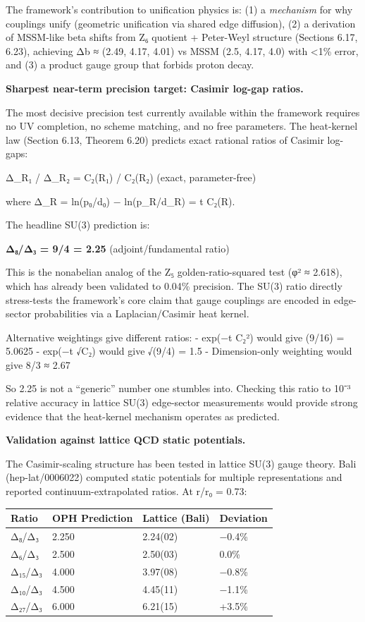 \documentclass[
]{article}
\newcounter{none} %
\begin{document}
The framework's contribution to unification physics is: (1) a
\emph{mechanism} for why couplings unify (geometric unification via
shared edge diffusion), (2) a derivation of MSSM-like beta shifts from
Z₆ quotient + Peter-Weyl structure (Sections 6.17, 6.23), achieving Δb ≈
(2.49, 4.17, 4.01) vs MSSM (2.5, 4.17, 4.0) with \textless1\% error, and
(3) a product gauge group that forbids proton decay.

\textbf{Sharpest near-term precision target: Casimir log-gap ratios.}

The most decisive precision test currently available within the
framework requires no UV completion, no scheme matching, and no free
parameters. The heat-kernel law (Section 6.13, Theorem 6.20) predicts
exact rational ratios of Casimir log-gaps:

Δ\_R₁ / Δ\_R₂ = C₂(R₁) / C₂(R₂) (exact, parameter-free)

where Δ\_R = ln(p₀/d₀) − ln(p\_R/d\_R) = t C₂(R).

The headline SU(3) prediction is:

\textbf{Δ₈/Δ₃ = 9/4 = 2.25} (adjoint/fundamental ratio)

This is the nonabelian analog of the Z₅ golden-ratio-squared test (φ² ≈
2.618), which has already been validated to 0.04\% precision. The SU(3)
ratio directly stress-tests the framework's core claim that gauge
couplings are encoded in edge-sector probabilities via a
Laplacian/Casimir heat kernel.

Alternative weightings give different ratios: - exp(−t C₂²) would give
(9/16) = 5.0625 - exp(−t √C₂) would give √(9/4) = 1.5 - Dimension-only
weighting would give 8/3 ≈ 2.67

So 2.25 is not a ``generic'' number one stumbles into. Checking this
ratio to 10⁻³ relative accuracy in lattice SU(3) edge-sector
measurements would provide strong evidence that the heat-kernel
mechanism operates as predicted.

\textbf{Validation against lattice QCD static potentials.}

The Casimir-scaling structure has been tested in lattice SU(3) gauge
theory. Bali (hep-lat/0006022) computed static potentials for multiple
representations and reported continuum-extrapolated ratios. At r/r₀ =
0.73:

{\def\LTcaptype{none} %
\begin{longtable}[]{@{}llll@{}}
\toprule\noalign{}
Ratio & OPH Prediction & Lattice (Bali) & Deviation \\
\midrule\noalign{}
\endhead
\bottomrule\noalign{}
\endlastfoot
Δ₈/Δ₃ & 2.250 & 2.24(02) & −0.4\% \\
Δ₆/Δ₃ & 2.500 & 2.50(03) & 0.0\% \\
Δ₁₅/Δ₃ & 4.000 & 3.97(08) & −0.8\% \\
Δ₁₀/Δ₃ & 4.500 & 4.45(11) & −1.1\% \\
Δ₂₇/Δ₃ & 6.000 & 6.21(15) & +3.5\% \\
\end{longtable}
}
\end{document}
